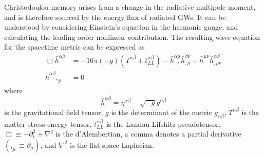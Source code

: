 \documentclass[twocolumn,showpacs,aps,prd,nobibnotes,floatfix]{revtex4-1}
\begin{document}

Christodoulou memory arises from a change in the radiative multipole moment, and is therefore sourced by the energy flux of radiated GWs. It can be understood by considering Einstein's equation in the harmonic gauge, and calculating the leading order nonlinear contribution. The resulting wave equation for the spacetime metric can be expressed as \cite{Thorne1980} 
\begin{subequations}
\begin{align}\label{eq:3.1a}	
\Box \bar{h}^{\alpha \beta} & = -16\pi (-g)(T^{\alpha\beta} + t_{LL}^{\alpha\beta})-\bar{h}^{\alpha\mu}_{,\nu}\bar{h}^{\beta\nu}_{,\mu}+\bar{h}^{\mu\nu}\bar{h}^{\alpha\beta}_{,\mu\nu}\\
\bar{h}^{\alpha \beta},_{\beta} & = 0
\end{align}
\end{subequations}
where
\begin{equation}
\bar{h}^{\alpha \beta} = \eta^{\alpha\beta}-\sqrt{-g}g^{\alpha\beta} 
\end{equation}
is the gravitational field tensor, $g$ is the determinant of the metric $g_{\alpha\beta}$, $T^{\alpha\beta}$ is the matter stress-energy tensor, $t^{\alpha\beta}_{LL}$ is the Landau-Lifshitz pseudotensor, $\Box \equiv  -\partial^{2}_{t} + \nabla^{2}$ is the d'Alembertian, a comma denotes a partial derivative $(,_{\mu}\equiv \partial_{\mu})$, and $\nabla^{2}$ is the flat-space Laplacian. 
\end{document}
